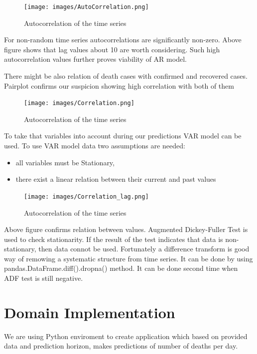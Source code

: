 \documentclass[conference]{IEEEtran}
\begin{document}
\begin{figure}[h!]
    \texttt{[image: images/AutoCorrelation.png]}
    \caption{Autocorrelation of the time series}
    \label{fig:AutoCorrelation}
\end{figure}

For non-random time series autocorrelations are significantly non-zero. Above figure shows that lag values about 10 are worth considering. 
 Such high autocorrelation values further proves viability of AR model.

There might be also relation of death cases with confirmed and recovered cases. Pairplot confirms our suspicion showing high correlation with both of them

\begin{figure}[h!]
    \texttt{[image: images/Correlation.png]}
    \caption{Autocorrelation of the time series}
    \label{fig:AutoCorrelation}
\end{figure}

To take that variables into account during our predictions VAR model can be used.
 To use VAR model data two assumptions are needed:
 \begin{itemize}
\item all variables must be Stationary,
\item there exist a linear relation between their current and past values
\end{itemize}

\begin{figure}[h!]
    \texttt{[image: images/Correlation\_lag.png]}
    \caption{Autocorrelation of the time series}
    \label{fig:AutoCorrelation}
\end{figure}

Above figure confirms relation between values. Augmented Dickey-Fuller Test is used to check stationarity. If the result of the test indicates that data is non-stationary,
then data connot be used. Fortunately a difference transform is good way of remowing a systematic structure from time series. It can be done by using
 pandas.DataFrame.diff().dropna() method. It can be done second time when ADF test is still negative.


\section{Domain Implementation}
We are using Python enviroment to create application which based on provided data and prediction horizon, makes predictions of number of deaths per day.
\end{document}
